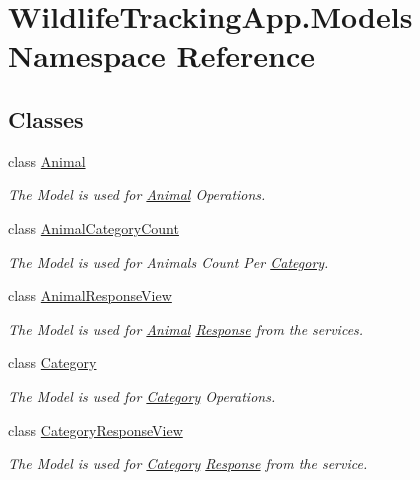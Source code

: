 \hypertarget{namespaceWildlifeTrackingApp_1_1Models}{}\section{Wildlife\+Tracking\+App.\+Models Namespace Reference}
\label{namespaceWildlifeTrackingApp_1_1Models}
\subsection*{Classes}
\begin{DoxyCompactItemize}
\item 
class \hyperlink{classWildlifeTrackingApp_1_1Models_1_1Animal}{Animal}
\begin{DoxyCompactList}\small\item\em The Model is used for \hyperlink{classWildlifeTrackingApp_1_1Models_1_1Animal}{Animal} Operations. \end{DoxyCompactList}\item 
class \hyperlink{classWildlifeTrackingApp_1_1Models_1_1AnimalCategoryCount}{Animal\+Category\+Count}
\begin{DoxyCompactList}\small\item\em The Model is used for Animals Count Per \hyperlink{classWildlifeTrackingApp_1_1Models_1_1Category}{Category}. \end{DoxyCompactList}\item 
class \hyperlink{classWildlifeTrackingApp_1_1Models_1_1AnimalResponseView}{Animal\+Response\+View}
\begin{DoxyCompactList}\small\item\em The Model is used for \hyperlink{classWildlifeTrackingApp_1_1Models_1_1Animal}{Animal} \hyperlink{classWildlifeTrackingApp_1_1Models_1_1Response}{Response} from the services. \end{DoxyCompactList}\item 
class \hyperlink{classWildlifeTrackingApp_1_1Models_1_1Category}{Category}
\begin{DoxyCompactList}\small\item\em The Model is used for \hyperlink{classWildlifeTrackingApp_1_1Models_1_1Category}{Category} Operations. \end{DoxyCompactList}\item 
class \hyperlink{classWildlifeTrackingApp_1_1Models_1_1CategoryResponseView}{Category\+Response\+View}
\begin{DoxyCompactList}\small\item\em The Model is used for \hyperlink{classWildlifeTrackingApp_1_1Models_1_1Category}{Category} \hyperlink{classWildlifeTrackingApp_1_1Models_1_1Response}{Response} from the service. \end{DoxyCompactList}\item 

\end{DoxyCompactItemize}
